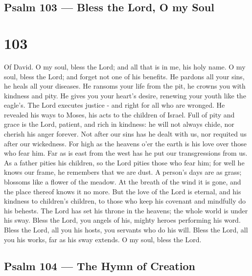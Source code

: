 \hypertarget{psalm-103-bless-the-lord-o-my-soul}{%
\subsection{Psalm 103 --- Bless the Lord, O my
Soul}\label{psalm-103-bless-the-lord-o-my-soul}}

\hypertarget{section-102}{%
\section{103}\label{section-102}}

Of David.  O my soul, bless the Lord; and all that is in me,
his holy name.  O my soul, bless the Lord; and forget not
one of his benefits.  He pardons all your sins, he heals all
your diseases.  He ransoms your life from the pit, he crowns
you with kindness and pity.  He gives you your heart's
desire, renewing your youth like the eagle's.  The Lord
executes justice - and right for all who are wronged.  He
revealed his ways to Moses, his acts to the children of Israel.
 Full of pity and grace is the Lord, patient, and rich in
kindness:  he will not always chide, nor cherish his anger
forever.  Not after our sins has he dealt with us, nor
requited us after our wickedness.  For high as the heavens
o'er the earth is his love over those who fear him.  Far as
is east from the west has he put our transgressions from us.
 As a father pities his children, so the Lord pities those
who fear him;  for well he knows our frame, he remembers
that we are dust.  A person's days are as grass; blossoms
like a flower of the meadow.  At the breath of the wind it
is gone, and the place thereof knows it no more.  But the
love of the Lord is eternal, and his kindness to children's children,
 to those who keep his covenant and mindfully do his
behests.  The Lord has set his throne in the heavens; the
whole world is under his sway.  Bless the Lord, you angels
of his, mighty heroes performing his word.  Bless the Lord,
all you his hosts, you servants who do his will.  Bless the
Lord, all you his works, far as his sway extends. O my soul, bless the
Lord.

\hypertarget{psalm-104-the-hymn-of-creation}{%
\subsection{Psalm 104 --- The Hymn of
Creation}\label{psalm-104-the-hymn-of-creation}}

